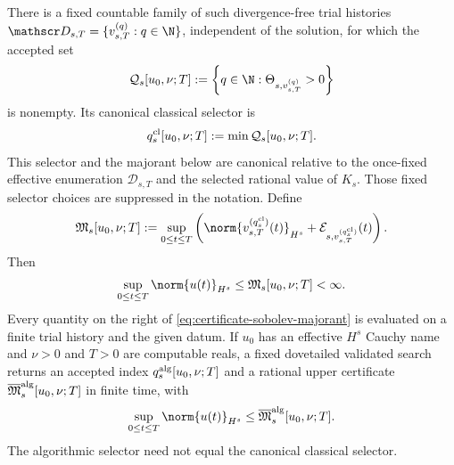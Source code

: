 \begin{proposition}
There is a fixed countable family of such divergence-free trial histories
\(\mathscr D_{s,T}=\{v_{s,T}^{(q)}:q\in\N\}\), independent of the solution,
for which the accepted set
\begin{equation}
 \mathcal Q_s[u_0,\nu;T]
 :=\left\{q\in\N:\Theta_{s,v_{s,T}^{(q)}}>0\right\}
 \label{eq:certificate-accepted-set}
\end{equation}
is nonempty.  Its canonical classical selector is
\begin{equation}
 q_s^{\rm cl}[u_0,\nu;T]
 :=\min\mathcal Q_s[u_0,\nu;T].
 \label{eq:certificate-classical-selector}
\end{equation}
This selector and the majorant below are canonical relative to the once-fixed
effective enumeration \(\mathscr D_{s,T}\) and the selected rational value of
\(K_s\).  Those fixed selector choices are suppressed in the notation.
Define
\begin{equation}
 \mathfrak M_s[u_0,\nu;T]
 :=
 \sup_{0\le t\le T}
 \left(
  \norm{v_{s,T}^{(q_s^{\rm cl})}(t)}_{H^s}
  +\mathcal E_{s,v_{s,T}^{(q_s^{\rm cl})}}(t)
 \right).
 \label{eq:certificate-sobolev-majorant}
\end{equation}
Then
\begin{equation}
 \sup_{0\le t\le T}\norm{u(t)}_{H^s}
 \le\mathfrak M_s[u_0,\nu;T]<\infty.
 \label{eq:certificate-sobolev-bound}
\end{equation}
Every quantity on the right of
\eqref{eq:certificate-sobolev-majorant} is evaluated on a finite trial
history and the given datum.  If \(u_0\) has an effective \(H^s\) Cauchy name
and \(\nu>0\) and \(T>0\) are computable reals, a fixed dovetailed validated
search returns an accepted index
\(q_s^{\rm alg}[u_0,\nu;T]\) and a rational upper certificate
\(\overline{\mathfrak M}_s^{\rm alg}[u_0,\nu;T]\) in finite time, with
\begin{equation}
 \sup_{0\le t\le T}\norm{u(t)}_{H^s}
 \le \overline{\mathfrak M}_s^{\rm alg}[u_0,\nu;T].
 \label{eq:certificate-algorithmic-majorant}
\end{equation}
The algorithmic selector need not equal the canonical classical selector.
\end{proposition}

